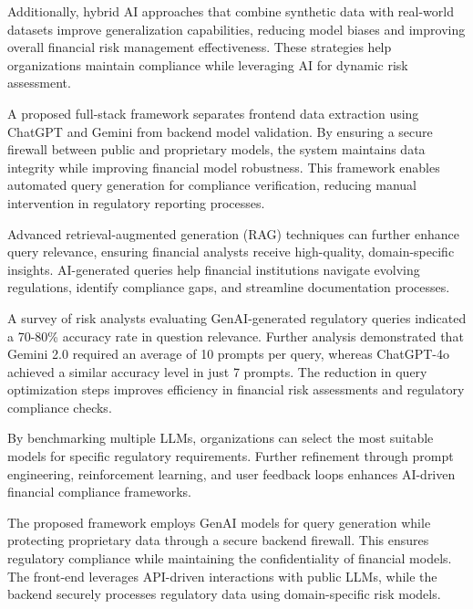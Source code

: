 \documentclass[a4paper,headinclude=on,footinclude=on,12pt,oneside]{scrbook}
\begin{document}
	Additionally, hybrid AI approaches that combine synthetic data with real-world datasets improve generalization capabilities, reducing model biases and improving overall financial risk management effectiveness. These strategies help organizations maintain compliance while leveraging AI for dynamic risk assessment.
	
	
	A proposed full-stack framework separates frontend data extraction using ChatGPT and Gemini from backend model validation. By ensuring a secure firewall between public and proprietary models, the system maintains data integrity while improving financial model robustness. This framework enables automated query generation for compliance verification, reducing manual intervention in regulatory reporting processes.
	
	Advanced retrieval-augmented generation (RAG) techniques can further enhance query relevance, ensuring financial analysts receive high-quality, domain-specific insights. AI-generated queries help financial institutions navigate evolving regulations, identify compliance gaps, and streamline documentation processes.
	
	A survey of risk analysts evaluating GenAI-generated regulatory queries indicated a 70-80\% accuracy rate in question relevance. Further analysis demonstrated that Gemini 2.0 required an average of 10 prompts per query, whereas ChatGPT-4o achieved a similar accuracy level in just 7 prompts. The reduction in query optimization steps improves efficiency in financial risk assessments and regulatory compliance checks.
	
	By benchmarking multiple LLMs, organizations can select the most suitable models for specific regulatory requirements. Further refinement through prompt engineering, reinforcement learning, and user feedback loops enhances AI-driven financial compliance frameworks.
	
	
	The proposed framework employs GenAI models for query generation while protecting proprietary data through a secure backend firewall. This ensures regulatory compliance while maintaining the confidentiality of financial models. The front-end leverages API-driven interactions with public LLMs, while the backend securely processes regulatory data using domain-specific risk models.
	
\end{document}
